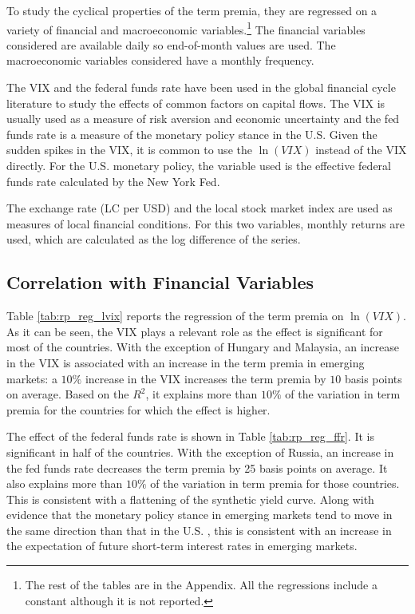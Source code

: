 To study the cyclical properties of the term premia, they are regressed on a variety of financial and macroeconomic variables.\footnote{The rest of the tables are in the Appendix. All the regressions include a constant although it is not reported.} The financial variables considered are available daily so end-of-month values are used. The macroeconomic variables considered have a monthly frequency.

The VIX and the federal funds rate have been used in the global financial cycle literature \citep[see][]{Rey:2013} to study the effects of common factors on capital flows. The VIX is usually used as a measure of risk aversion and economic uncertainty and the fed funds rate is a measure of the monetary policy stance in the U.S. Given the sudden spikes in the VIX, it is common to use the $\ln \left( VIX \right)$ instead of the VIX directly. For the U.S. monetary policy, the variable used is the effective federal funds rate calculated by the New York Fed. 

The exchange rate (LC per USD) and the local stock market index are used as measures of local financial conditions. For this two variables, monthly returns are used, which are calculated as the log difference of the series.

\subsection{Correlation with Financial Variables}
Table \ref{tab:rp_reg_lvix} reports the regression of the term premia on $\ln \left( VIX \right)$. As it can be seen, the VIX plays a relevant role as the effect is significant for most of the countries. With the exception of Hungary and Malaysia, an increase in the VIX is associated with an increase in the term premia in emerging markets: a $10\%$ increase in the VIX increases the term premia by $10$ basis points on average. Based on the $R^2$, it explains more than $10\%$ of the variation in term premia for the countries for which the effect is higher.

The effect of the federal funds rate is shown in Table \ref{tab:rp_reg_ffr}. It is significant in half of the countries. With the exception of Russia, an increase in the fed funds rate decreases the term premia by 25 basis points on average. It also explains more than $10\%$ of the variation in term premia for those countries. This is consistent with a flattening of the synthetic yield curve. Along with evidence that the monetary policy stance in emerging markets tend to move in the same direction than that in the U.S. \citep*{AnayaHachulaOffermanns:2017}, this is consistent with an increase in the expectation of future short-term interest rates in emerging markets.

